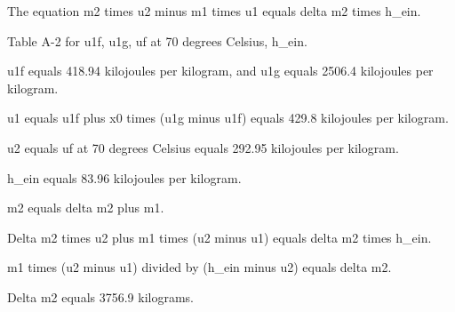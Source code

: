 The equation m2 times u2 minus m1 times u1 equals delta m2 times h_ein.

Table A-2 for u1f, u1g, uf at 70 degrees Celsius, h_ein.

u1f equals 418.94 kilojoules per kilogram, and u1g equals 2506.4 kilojoules per kilogram.

u1 equals u1f plus x0 times (u1g minus u1f) equals 429.8 kilojoules per kilogram.

u2 equals uf at 70 degrees Celsius equals 292.95 kilojoules per kilogram.

h_ein equals 83.96 kilojoules per kilogram.

m2 equals delta m2 plus m1.

Delta m2 times u2 plus m1 times (u2 minus u1) equals delta m2 times h_ein.

m1 times (u2 minus u1) divided by (h_ein minus u2) equals delta m2.

Delta m2 equals 3756.9 kilograms.